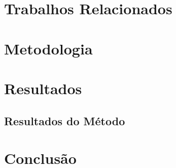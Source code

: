 \documentclass[
	12pt,				%
	openright,			%
	oneside,			%
	a4paper,			%
	english,			%
	french,				%
	spanish,			%
	brazil,				%
	]{abntex2}
\begin{document}
\chapter{Trabalhos Relacionados}
\label{ch: trabalhos relacionados}

\chapter{Metodologia}
\label{ch: materiais e métodos}




\chapter{Resultados}
\label{ch: resultados} 


\section{Resultados do Método}
\label{sec: resultados}



 \chapter{Conclusão}
 \label{ch: conclusao}
 



% 

\postextual



\end{document}
